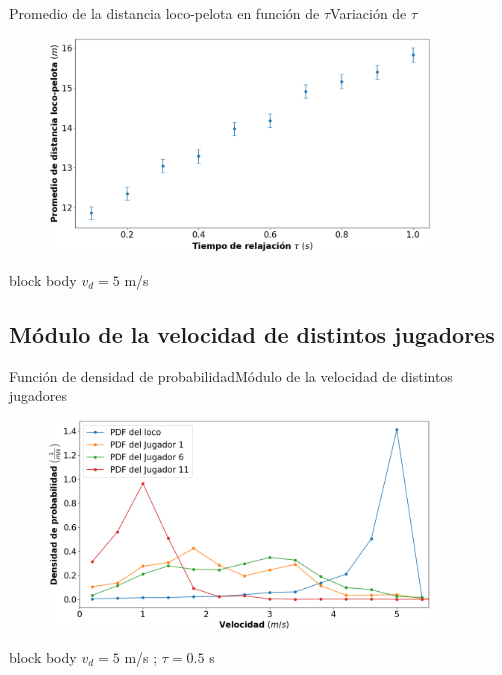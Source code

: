 \documentclass{beamer}
\begin{document}
            \begin{frame}{Promedio de la distancia loco-pelota en función de $\tau$}{Variación de $\tau$}
                \begin{figure}[H!]
                    \includegraphics[width=0.9\textwidth]{./distancia_vs_tau}
                    \label{fig:futbol_9}
                \end{figure}
                \begin{beamercolorbox}[sep=5pt,center]{block body}
                    \centering
                    \small{$v_d = 5$ m/s}
                \end{beamercolorbox}
            \end{frame}

        \subsection{Módulo de la velocidad de distintos jugadores}

            \begin{frame}{Función de densidad de probabilidad}{Módulo de la velocidad de distintos jugadores}
                \begin{figure}[H!]
                    \includegraphics[width=0.9\textwidth]{./pdf}
                    \label{fig:futbol_10}
                \end{figure}
                \begin{beamercolorbox}[sep=5pt,center]{block body}
                    \centering
                    \small{$v_d = 5$ m/s ; $\tau = 0.5$ s}
                \end{beamercolorbox}
            \end{frame}
\end{document}
